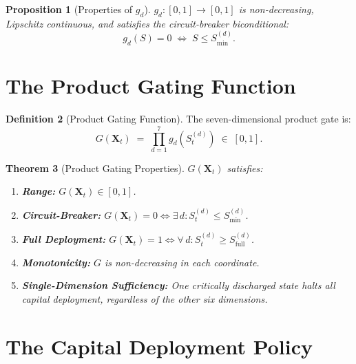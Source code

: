 \documentclass[12pt,openany]{book}
\numberwithin{equation}{chapter}
\theoremstyle{plain}
\newtheorem{theorem}{Theorem}[chapter]
\newtheorem{proposition}[theorem]{Proposition}
\theoremstyle{definition}
\newtheorem{definition}[theorem]{Definition}
\theoremstyle{remark}
\def\mathcal#1{#1}%
\begin{document}
\begin{proposition}[Properties of $g_d$]
\label{prop:gating-properties}
$g_d : [0,1] \to [0,1]$ is non-decreasing, Lipschitz continuous,
and satisfies the circuit-breaker biconditional:
\begin{equation}
  g_d(\mathcal{S}) = 0
  \;\Longleftrightarrow\;
  \mathcal{S} \leq \mathcal{S}_{\min}^{(d)}.
\end{equation}
\end{proposition}

\section{The Product Gating Function}

\begin{definition}[Product Gating Function]
\label{def:product-gating}
The seven-dimensional product gate is:
\begin{equation}
  G(\mathbf{X}_t) \;=\; \prod_{d=1}^{7} g_d\!\left(\mathcal{S}_t^{(d)}\right)
  \;\in\; [0,1].
  \label{eq:product-gating}
\end{equation}
\end{definition}

\begin{theorem}[Product Gating Properties]
\label{thm:product-gating}
$G(\mathbf{X}_t)$ satisfies:
\begin{enumerate}
  \item \textbf{Range:} $G(\mathbf{X}_t) \in [0,1]$.
  \item \textbf{Circuit-Breaker:}
        $G(\mathbf{X}_t) = 0 \Leftrightarrow
         \exists\,d : \mathcal{S}_t^{(d)} \leq \mathcal{S}_{\min}^{(d)}$.
  \item \textbf{Full Deployment:}
        $G(\mathbf{X}_t) = 1 \Leftrightarrow
         \forall\,d : \mathcal{S}_t^{(d)} \geq \mathcal{S}_{\mathrm{full}}^{(d)}$.
  \item \textbf{Monotonicity:} $G$ is non-decreasing in each coordinate.
  \item \textbf{Single-Dimension Sufficiency:}
        One critically discharged state halts all capital deployment,
        regardless of the other six dimensions.
\end{enumerate}
\end{theorem}

\section{The Capital Deployment Policy}
\end{document}
